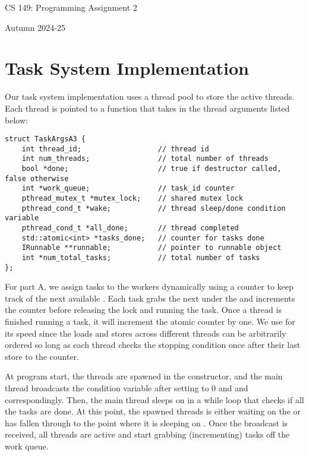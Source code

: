 \documentclass[11pt]{article}
\begin{document}
\lstset{language=C++,basicstyle=\footnotesize\ttfamily,breaklines=true}

\fancyhf{}
\setlength{\headheight}{14pt}
\pagestyle{fancy}

\centerline{\Large CS 149: Programming Assignment 2}
\centerline{Autumn 2024-25}

\section{Task System Implementation}

Our task system implementation uses a thread pool to store the active threads.
Each thread is pointed to a  function that takes in the
thread arguments listed below:
\begin{lstlisting}
struct TaskArgsA3 {
    int thread_id;                  // thread id
    int num_threads;                // total number of threads
    bool *done;                     // true if destructor called, false otherwise
    int *work_queue;                // task_id counter
    pthread_mutex_t *mutex_lock;    // shared mutex lock
    pthread_cond_t *wake;           // thread sleep/done condition variable
    pthread_cond_t *all_done;       // thread completed 
    std::atomic<int> *tasks_done;   // counter for tasks done
    IRunnable **runnable;           // pointer to runnable object
    int *num_total_tasks;           // total number of tasks
};
\end{lstlisting}

For part A, we assign tasks to the workers dynamically using a 
counter to keep track of the next available . Each task grabs the
next  under the  and increments the counter
before releasing the lock and running the task. Once a thread is finished
running a task, it will increment the atomic  counter by one.
We use  for its speed since the loads and
stores across different threads can be arbitrarily ordered so long as each
thread checks the stopping condition once after their last store to the counter.

\smallskip
At program start, the threads are spawned in the constructor, and the main
thread broadcasts the  condition variable after setting
 to 0 and  and 
correspondingly. Then, the main thread sleeps on  in a while loop
that checks if all the tasks are done. At this point, the spawned threads is either
waiting on the  or has fallen through to the point where it is
sleeping on . Once the broadcast is received, all threads are active
and start grabbing (incrementing) tasks off the work queue.
\end{document}

